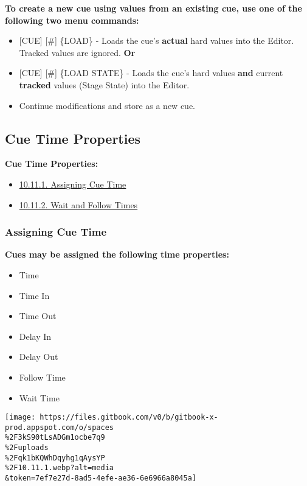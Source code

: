 \documentclass[
]{article}
\begin{document}
\textbf{To create a new cue using values from an existing cue, use one of the following two menu commands:}

\begin{itemize}
\item
  {[}CUE{]} {[}\#{]} \{LOAD\} - Loads the cue's \textbf{actual} hard values into the Editor. Tracked values are ignored. \textbf{Or}
\item
  {[}CUE{]} {[}\#{]} \{LOAD STATE\} - Loads the cue's hard values \textbf{and} current \textbf{tracked} values (Stage State) into the Editor.
\item
  Continue modifications and store as a new cue.
\end{itemize}

\hypertarget{cue-time-properties}{%
\subsection{Cue Time Properties}\label{cue-time-properties}}

\textbf{Cue Time Properties:}

\begin{itemize}
\item
  \href{https://vibemanual.compulite.com/programming-cues-and-scenes.html\#assigning-cue-time}{10.11.1. Assigning Cue Time}
\item
  \href{https://vibemanual.compulite.com/programming-cues-and-scenes.html\#wait-and-follow-times}{10.11.2. Wait and Follow Times}
\end{itemize}

\hypertarget{assigning-cue-time}{%
\subsubsection{Assigning Cue Time}\label{assigning-cue-time}}

\textbf{Cues may be assigned the following time properties:}

\begin{itemize}
\item
  Time
\item
  Time In
\item
  Time Out
\item
  Delay In
\item
  Delay Out
\item
  Follow Time
\item
  Wait Time
\end{itemize}

\texttt{[image: https://files.gitbook.com/v0/b/gitbook-x-prod.appspot.com/o/spaces\\\%2F3kS90tLsADGm1ocbe7q9\\\%2Fuploads\\\%2Fqk1bKQWhDqyhg1qAysYP\\\%2F10.11.1.webp?alt=media\\\&token=7ef7e27d-8ad5-4efe-ae36-6e6966a8045a]}
\end{document}
